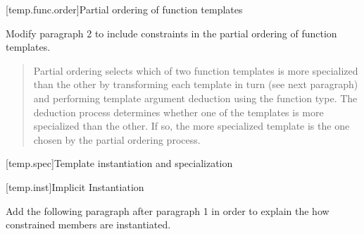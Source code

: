[temp.func.order]{Partial ordering of function templates}

Modify paragraph 2 to include constraints in the partial ordering
of function templates.

\begin{quote}
\setcounter{Paras}{1}
\pnum
Partial ordering selects which of two function templates is 
more specialized than the other by transforming each template 
in turn (see next paragraph) and performing template argument 
deduction using the function type. The deduction process 
determines whether one of the templates is more specialized 
than the other.
% 
If so, the more specialized template is the one chosen by the 
partial ordering process. 
% 
\end{quote}


[temp.spec]{Template instantiation and specialization}

[temp.inst]{Implicit Instantiation}
    
Add the following paragraph after paragraph 1 in order to explain
the how constrained members are instantiated.

